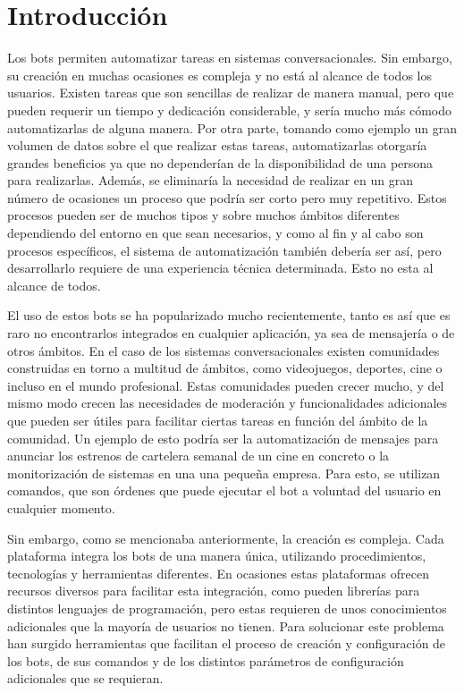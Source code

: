 \chapter{Introducción}

Los bots permiten automatizar tareas en sistemas conversacionales. Sin embargo, su creación en muchas ocasiones es compleja y no está al alcance de todos los usuarios. Existen tareas que son sencillas de realizar de manera manual, pero que pueden requerir un tiempo y dedicación considerable, y sería mucho más cómodo automatizarlas de alguna manera. Por otra parte, tomando como ejemplo un gran volumen de datos sobre el que realizar estas tareas, automatizarlas otorgaría grandes beneficios ya que no dependerían de la disponibilidad de una persona para realizarlas. Además, se eliminaría la necesidad de realizar en un gran número de ocasiones un proceso que podría ser corto pero muy repetitivo. Estos procesos pueden ser de muchos tipos y sobre muchos ámbitos diferentes dependiendo del entorno en que sean necesarios, y como al fin y al cabo son procesos específicos, el sistema de automatización también debería ser así, pero desarrollarlo requiere de una experiencia técnica determinada. Esto no esta al alcance de todos.

El uso de estos bots se ha popularizado mucho recientemente, tanto es así que es raro no encontrarlos integrados en cualquier aplicación, ya sea de mensajería o de otros ámbitos. En el caso de los sistemas conversacionales existen comunidades construidas en torno a multitud de ámbitos, como videojuegos, deportes, cine o incluso en el mundo profesional. Estas comunidades pueden crecer mucho, y del mismo modo crecen las necesidades de moderación y funcionalidades adicionales que pueden ser útiles para facilitar ciertas tareas en función del ámbito de la comunidad. Un ejemplo de esto podría ser la automatización de mensajes para anunciar los estrenos de cartelera semanal de un cine en concreto o la monitorización de sistemas en una una pequeña empresa. Para esto, se utilizan comandos, que son órdenes que puede ejecutar el bot a voluntad del usuario en cualquier momento.

Sin embargo, como se mencionaba anteriormente, la creación es compleja. Cada plataforma integra los bots de una manera única, utilizando procedimientos, tecnologías y herramientas diferentes. En ocasiones estas plataformas ofrecen recursos diversos para facilitar esta integración, como pueden librerías para distintos lenguajes de programación, pero estas requieren de unos conocimientos adicionales que la mayoría de usuarios no tienen. Para solucionar este problema han surgido herramientas que facilitan el proceso de creación y configuración de los bots, de sus comandos y de los distintos parámetros de configuración adicionales que se requieran.


